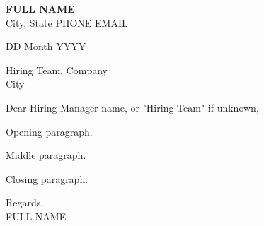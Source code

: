 \documentclass[11pt,a4paper]{article}
\begin{document}
{\large\bfseries {{FULL NAME}}}\\
{{City, State}} \textbullet{} \href{tel:{{PHONE}}}{{{PHONE}}} \textbullet{}
\href{mailto:{{EMAIL}}}{{{EMAIL}}}

\vspace{1em}
{{DD Month YYYY}}

\vspace{0.5em}
Hiring Team, {{Company}}\\
{{City}}

\vspace{1em}
Dear {{Hiring Manager name, or "Hiring Team" if unknown}},

{{Opening paragraph.}}

{{Middle paragraph.}}

{{Closing paragraph.}}

\vspace{1em}
Regards,\\
{{FULL NAME}}
\end{document}
